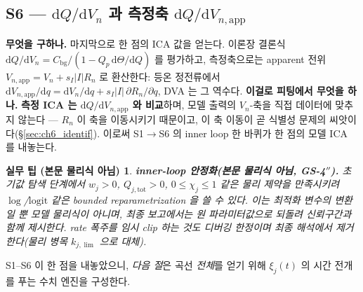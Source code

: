 \documentclass[11pt,a4paper]{article}
\newtheorem*{practicebox}{실무 팁 (본문 물리식 아님)}
\newcommand{\dd}{\mathrm{d}}
\newcommand{\app}{\mathrm{app}}
\newcommand{\bg}{\mathrm{bg}}
\newcommand{\tot}{\mathrm{tot}}
\begin{document}
\subsection{S6 — $\dd Q/\dd V_n$ 과 측정축 $\dd Q/\dd V_{n,\app}$}\label{sec:ch6_S6}
\textbf{무엇을 구하나.} 마지막으로 한 점의 ICA 값을 얻는다. 이론장 결론식 $\dd Q/\dd V_n=C_\bg/(1-Q_p\,\dd\Theta/\dd Q)$
를 평가하고, 측정축으로는 apparent 전위 $V_{n,\app}=V_n+s_I|I|R_n$ 로 환산한다: 등온 정전류에서
$\dd V_{n,\app}/\dd q=\dd V_n/\dd q+s_I|I|\,\partial R_n/\partial q$, DVA 는 그 역수다.
\textbf{이걸로 피팅에서 무엇을 하나.} \textbf{측정 ICA 는 $\dd Q/\dd V_{n,\app}$ 와 비교}하며, 모델 출력의
$V_n$-축을 직접 데이터에 맞추지 않는다 — $R_n$ 이 축을 이동시키기 때문이고, 이 축 이동이 곧 식별성 문제의
씨앗이다(\S\ref{sec:ch6_identif}). 이로써 S1$\to$S6 의 inner loop 한 바퀴가 한 점의 모델 ICA 를 내놓는다.

\begin{practicebox}
\textbf{inner-loop 안정화(본문 물리식 아님, GS-4$''$).} 초기값 탐색 단계에서 $w_j>0$, $Q_{j,\tot}>0$,
$0\le\chi_j\le1$ 같은 물리 제약을 만족시키려 $\log$/$\mathrm{logit}$ 같은 bounded reparametrization 을 쓸 수
있다. 이는 \emph{최적화 변수의 변환일 뿐} 모델 물리식이 아니며, 최종 보고에서는 원 파라미터값으로 되돌려
신뢰구간과 함께 제시한다. rate 폭주를 임시 clip 하는 것도 디버깅 한정이며 최종 해석에서 제거한다(물리 병목
$k_{j,\lim}$ 으로 대체).
\end{practicebox}

S1--S6 이 한 점을 내놓았으니, \emph{다음 절}은 곡선 \emph{전체}를 얻기 위해 $\xi_j(t)$ 의 시간 전개를 푸는 수치
엔진을 구성한다.

\end{document}

